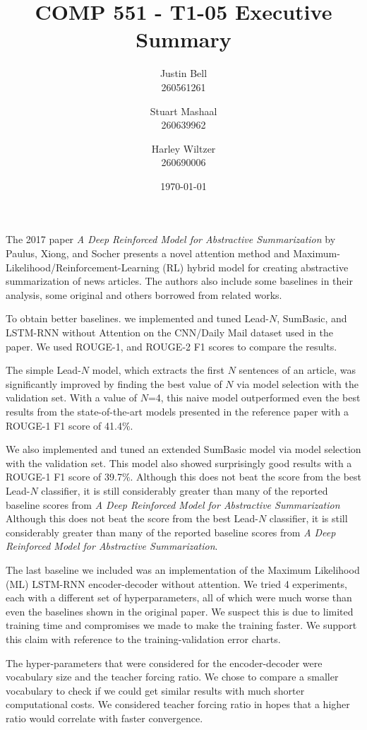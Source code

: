 \documentclass[10pt]{article}
\title{COMP 551 - T1-05 Executive Summary}
\author{Justin Bell\\260561261\and Stuart Mashaal\\260639962\and Harley Wiltzer\\260690006}
\date{\today}
\begin{document}
\maketitle
\begin{multicols}{2}
	The 2017 paper \textit{A Deep Reinforced Model for Abstractive Summarization} by Paulus, Xiong,
	and Socher presents a novel attention
method and Maximum-Likelihood/Reinforcement-Learning (RL) hybrid model for creating abstractive
summarization of news articles. The authors also include some baselines in their analysis, some
original and others borrowed from related works.

To obtain better baselines. we implemented and tuned Lead-$N$, SumBasic, and LSTM-RNN without
Attention on the CNN/Daily Mail dataset used in the paper. We used ROUGE-1, and ROUGE-2 F1 scores to
compare the results.

The simple Lead-$N$ model, which extracts the first $N$ sentences of an article, was significantly
improved by finding the best value of $N$ via model selection with the validation set. With a value
of $N$=4, this naive model outperformed even the best results from the state-of-the-art models
presented in the reference paper with a ROUGE-1 F1 score of 41.4\%.

We also implemented and tuned an extended SumBasic model via model selection with the validation
set. This model also showed surprisingly good results with a ROUGE-1 F1 score of 39.7\%. Although
this does not beat the score from the best Lead-$N$ classifier, it is still considerably greater
than many of the reported baseline scores from \textit{A Deep Reinforced Model for Abstractive
Summarization} Although this does not beat the score from the best Lead-$N$ classifier, it is still
considerably greater than many of the reported baseline scores from \textit{A Deep Reinforced Model
for Abstractive Summarization}.

The last baseline we included was an implementation of the Maximum Likelihood (ML) LSTM-RNN
encoder-decoder without attention. We tried 4 experiments, each with a different set of
hyperparameters, all of which were much worse than even the baselines shown in the original paper. We
suspect this is due to limited training time and compromises we made to make the training faster. We
support this claim with reference to the training-validation error charts.

The hyper-parameters that were considered for the encoder-decoder were vocabulary size and the
teacher forcing ratio. We chose to compare a smaller vocabulary to check if we could get similar
results with much shorter computational costs. We considered teacher forcing ratio in hopes that a
higher ratio would correlate with faster convergence.


\end{multicols}
\end{document}

